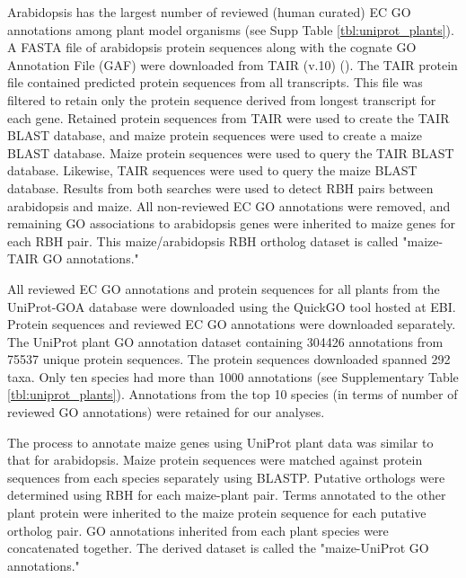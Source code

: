 Arabidopsis has the largest number of reviewed (human curated) EC GO annotations among plant model organisms (see Supp Table \ref{tbl:uniprot_plants}). A FASTA file of arabidopsis protein sequences along with the cognate GO Annotation File (GAF) were downloaded from TAIR (v.10) (\cite{berardini_2015-Nk}). The TAIR protein file contained predicted protein sequences from all transcripts. This file was filtered to retain only the protein sequence derived from longest transcript for each gene. Retained protein sequences from TAIR were used to create the TAIR BLAST database, and maize protein sequences were used to create a maize BLAST database. Maize protein sequences were used to query the TAIR BLAST database. Likewise, TAIR sequences were used to query the maize BLAST database.  Results from both searches were used to detect RBH pairs between arabidopsis and maize. All non-reviewed EC GO annotations were removed, and remaining GO associations to arabidopsis genes were inherited to maize genes for each RBH pair. This maize/arabidopsis RBH ortholog dataset is called "maize-TAIR GO annotations."


All reviewed EC GO annotations and protein sequences for all plants from the UniProt-GOA database were downloaded using the QuickGO tool hosted at EBI. Protein sequences and reviewed EC GO annotations were downloaded separately. The UniProt plant GO annotation dataset containing \num{304426} annotations from \num{75537} unique protein sequences. The protein sequences downloaded spanned 292 taxa. Only ten species had more than \num{1000} annotations (see Supplementary Table \ref{tbl:uniprot_plants}). Annotations from the top 10 species (in terms of number of reviewed GO annotations) were retained for our analyses.

The process to annotate maize genes using UniProt plant data was similar to that for arabidopsis. Maize protein sequences were matched against protein sequences from each species separately using BLASTP. Putative orthologs were determined using RBH for each maize-plant pair. Terms annotated to the other plant protein were inherited to the maize protein sequence for each putative ortholog pair. GO annotations inherited from each plant species were concatenated together. The derived dataset is called the "maize-UniProt GO annotations."

